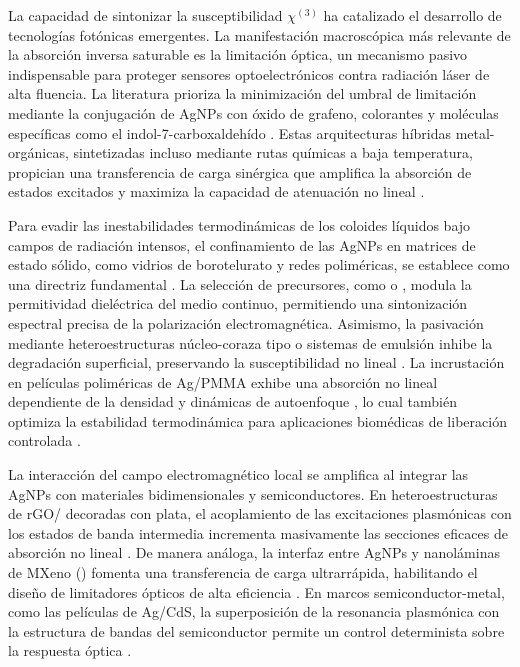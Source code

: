 La capacidad de sintonizar la susceptibilidad $\chi^{(3)}$ ha catalizado el
desarrollo de tecnologías fotónicas emergentes. La manifestación macroscópica
más relevante de la absorción inversa saturable es la limitación óptica, un
mecanismo pasivo indispensable para proteger sensores optoelectrónicos contra
radiación láser de alta fluencia. La literatura prioriza la minimización del
umbral de limitación mediante la conjugación de AgNPs con óxido de grafeno,
colorantes y moléculas específicas como el indol-7-carboxaldehído
\cite{lakheraEnhancementOpticalLimiting2025, fathimaPlasmonEnhancedLinear2021,
salahBoostingNonlinearOptical2023,
lakheraIndole7carboxaldehydeFunctionalizedSilver2025}. Estas arquitecturas
híbridas metal-orgánicas, sintetizadas incluso mediante rutas químicas a baja
temperatura, propician una transferencia de carga sinérgica que amplifica la
absorción de estados excitados y maximiza la capacidad de atenuación no lineal
\cite{lakheraLowtemperatureChemicalSynthesis2025}.

Para evadir las inestabilidades termodinámicas de los coloides líquidos bajo
campos de radiación intensos, el confinamiento de las AgNPs en matrices de
estado sólido, como vidrios de borotelurato y redes poliméricas, se establece
como una directriz fundamental \cite{ganjiNonlinearOpticalStructural2025,
al-hadeethiNanosecondNonlinearOptical2022, zhouSituFormationSilver2024}.
La selección de precursores, como  o , modula la
permitividad dieléctrica del medio continuo, permitiendo una sintonización
espectral precisa de la polarización electromagnética. Asimismo, la pasivación
mediante heteroestructuras núcleo-coraza tipo  o sistemas de
emulsión inhibe la degradación superficial, preservando la susceptibilidad no
lineal \cite{jagannathanPrecursorBasedTuning2021,
abhiramComparativeStudyAuAg2021,
adampourEmulsionstabilizedSilverNanoparticles2025,
chevychelovaNonlinearOpticalProperties2021}. La incrustación en películas
poliméricas de Ag/PMMA exhibe una absorción no lineal dependiente de la
densidad y dinámicas de autoenfoque \cite{abbasNonlinearOpticalProperties2022},
lo cual también optimiza la estabilidad termodinámica para aplicaciones
biomédicas de liberación controlada \cite{chaionSilverNanoparticleBased2025}.

La interacción del campo electromagnético local se amplifica al integrar las
AgNPs con materiales bidimensionales y semiconductores. En heteroestructuras de
rGO/ decoradas con plata, el acoplamiento de las excitaciones
plasmónicas con los estados de banda intermedia incrementa masivamente las
secciones eficaces de absorción no lineal
\cite{dhanushaMidgapStatesMediated2025}. De manera análoga, la interfaz entre
AgNPs y nanoláminas de MXeno () fomenta una transferencia de carga
ultrarrápida, habilitando el diseño de limitadores ópticos de alta eficiencia
\cite{yanEnhancedOpticalNonlinearity2021}. En marcos semiconductor-metal, como
las películas de Ag/CdS, la superposición de la resonancia plasmónica con la
estructura de bandas del semiconductor permite un control determinista sobre la
respuesta óptica \cite{yuStudyNonlinearOptical2026}.

